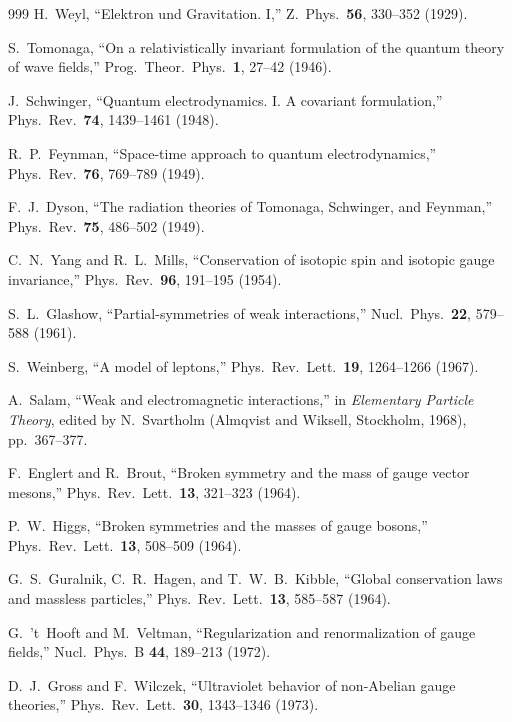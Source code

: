 \begin{thebibliography}{999}
H.~Weyl,
``Elektron und Gravitation. I,''
Z.\ Phys.\ \textbf{56}, 330--352 (1929).

S.~Tomonaga,
``On a relativistically invariant formulation of the quantum theory of wave
fields,'' Prog.\ Theor.\ Phys.\ \textbf{1}, 27--42 (1946).

J.~Schwinger,
``Quantum electrodynamics. I. A covariant formulation,''
Phys.\ Rev.\ \textbf{74}, 1439--1461 (1948).

R.~P.~Feynman,
``Space-time approach to quantum electrodynamics,''
Phys.\ Rev.\ \textbf{76}, 769--789 (1949).

F.~J.~Dyson,
``The radiation theories of Tomonaga, Schwinger, and Feynman,''
Phys.\ Rev.\ \textbf{75}, 486--502 (1949).

C.~N.~Yang and R.~L.~Mills,
``Conservation of isotopic spin and isotopic gauge invariance,''
Phys.\ Rev.\ \textbf{96}, 191--195 (1954).

S.~L.~Glashow,
``Partial-symmetries of weak interactions,''
Nucl.\ Phys.\ \textbf{22}, 579--588 (1961).

S.~Weinberg,
``A model of leptons,'' Phys.\ Rev.\ Lett.\ \textbf{19}, 1264--1266 (1967).

A.~Salam,
``Weak and electromagnetic interactions,'' in
\emph{Elementary Particle Theory}, edited by N.~Svartholm
(Almqvist and Wiksell, Stockholm, 1968), pp.~367--377.

F.~Englert and R.~Brout,
``Broken symmetry and the mass of gauge vector mesons,''
Phys.\ Rev.\ Lett.\ \textbf{13}, 321--323 (1964).

P.~W.~Higgs,
``Broken symmetries and the masses of gauge bosons,''
Phys.\ Rev.\ Lett.\ \textbf{13}, 508--509 (1964).

G.~S.~Guralnik, C.~R.~Hagen, and T.~W.~B.~Kibble,
``Global conservation laws and massless particles,''
Phys.\ Rev.\ Lett.\ \textbf{13}, 585--587 (1964).

G.~'t~Hooft and M.~Veltman,
``Regularization and renormalization of gauge fields,''
Nucl.\ Phys.\ B \textbf{44}, 189--213 (1972).

D.~J.~Gross and F.~Wilczek,
``Ultraviolet behavior of non-Abelian gauge theories,''
Phys.\ Rev.\ Lett.\ \textbf{30}, 1343--1346 (1973).


\end{thebibliography}
